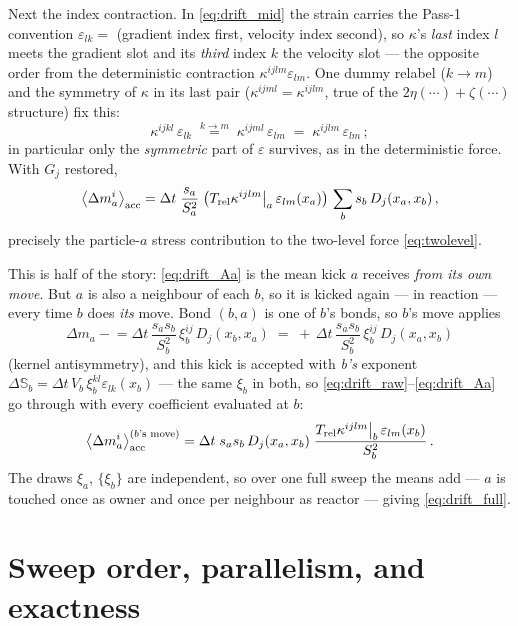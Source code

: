 \documentclass[12pt,aps,preprint,nofootinbib,noshowkeys,noshowpacs,longbibliography,superscriptaddress,tightenlines]{revtex4-2}
\def\Sbb{{\mathbb S}}
\def\st{\begin{equation}}
\def\stp{\end{equation}}
\begin{document}
Next the index contraction.  In \eqref{eq:drift_mid} the strain carries the
Pass-1 convention $\varepsilon_{lk}=$ (gradient index first, velocity index
second), so $\kappa$'s \emph{last} index $l$ meets the gradient slot and its
\emph{third} index $k$ the velocity slot --- the opposite order from the
deterministic contraction $\kappa^{ijlm}\varepsilon_{lm}$.  One dummy relabel
($k\to m$) and the symmetry of $\kappa$ in its last pair
($\kappa^{ijml}=\kappa^{ijlm}$, true of the $2\eta(\cdots)+\zeta(\cdots)$
structure) fix this:
\st
\kappa^{ijkl}\,\varepsilon_{lk}
   \;\overset{k\to m}{=}\; \kappa^{ijml}\,\varepsilon_{lm}
   \;=\; \kappa^{ijlm}\,\varepsilon_{lm}\,;
\stp
in particular only the \emph{symmetric} part of $\varepsilon$ survives, as in
the deterministic force.  With $G_j$ restored,
\st
\label{eq:drift_Aa}
\big\langle\Delta m_a^i\big\rangle_{\rm acc}
   = \Delta t\;\frac{s_a}{S_a^{2}}\;
     \big(T_{\rm rel}\kappa^{ijlm}\big|_a\,\varepsilon_{lm}(x_a)\big)\,
     \sum_b s_b\,D_j(x_a,x_b)\,,
\stp
precisely the particle-$a$ stress contribution to the two-level force
\eqref{eq:twolevel}.

This is half of the story: \eqref{eq:drift_Aa} is the mean kick $a$ receives
\emph{from its own move}.  But $a$ is also a neighbour of each $b$, so it is
kicked again --- in reaction --- every time $b$ does \emph{its} move.  Bond
$(b,a)$ is one of $b$'s bonds, so $b$'s move applies
\st
\Delta m_a \mathrel{-}= \Delta t\,\frac{s_a s_b}{S_b^{2}}\,
   \xi_b^{ij}\,D_j(x_b,x_a)
 \;=\; +\,\Delta t\,\frac{s_a s_b}{S_b^{2}}\,\xi_b^{ij}\,D_j(x_a,x_b)
\stp
(kernel antisymmetry), and this kick is accepted with \emph{b's} exponent
$\Delta\Sbb_b=\Delta t\,V_b\,\xi_b^{kl}\varepsilon_{lk}(x_b)$ --- the same
$\xi_b$ in both, so \eqref{eq:drift_raw}--\eqref{eq:drift_Aa} go through with
every coefficient evaluated at $b$:
\st
\big\langle\Delta m_a^i\big\rangle_{\rm acc}^{(b\text{'s move})}
   = \Delta t\;s_a s_b\,D_j(x_a,x_b)\;
     \frac{T_{\rm rel}\kappa^{ijlm}\big|_b\,\varepsilon_{lm}(x_b)}{S_b^{2}}\,.
\stp
The draws $\xi_a$, $\{\xi_b\}$ are independent, so over one full sweep the
means add --- $a$ is touched once as owner and once per neighbour as reactor
--- giving \eqref{eq:drift_full}.

\section{Sweep order, parallelism, and exactness}
\label{app:sweep}
\end{document}
